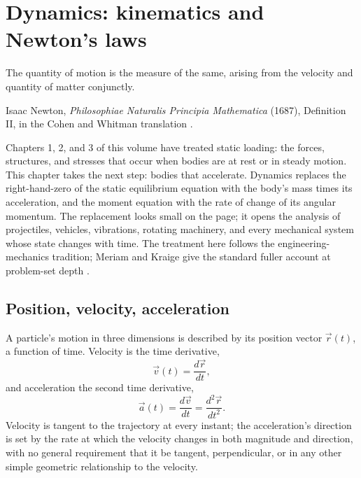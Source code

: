 \chapter{Dynamics: kinematics and Newton's laws}
\label{vol03:ch04}

\epigraph{The quantity of motion is the measure of the same, arising
from the velocity and quantity of matter conjunctly.}{Isaac Newton,
\emph{Philosophiae Naturalis Principia Mathematica} (1687), Definition
II, in the Cohen and Whitman translation \cite[p.~404]{hist:newton1687}.}


\noindent
Chapters 1, 2, and 3 of this volume have treated static loading: the
forces, structures, and stresses that occur when bodies are at rest
or in steady motion. This chapter takes the next step: bodies that
accelerate. Dynamics replaces the right-hand-zero of the static
equilibrium equation with the body's mass times its acceleration, and
the moment equation with the rate of change of its angular momentum.
The replacement looks small on the page; it opens the analysis of
projectiles, vehicles, vibrations, rotating machinery, and every
mechanical system whose state changes with time. The treatment here
follows the engineering-mechanics tradition; Meriam and Kraige give
the standard fuller account at problem-set depth
\cite{text:meriam-kraige2018}.

\section{Position, velocity, acceleration}

A particle's motion in three dimensions is described by its position
vector $\vec{r}(t)$, a function of time. Velocity is the time
derivative,
\[
\vec{v}(t) = \frac{d\vec{r}}{dt},
\]
and acceleration the second time derivative,
\[
\vec{a}(t) = \frac{d\vec{v}}{dt} = \frac{d^2 \vec{r}}{dt^2}.
\]
Velocity is tangent to the trajectory at every instant; the
acceleration's direction is set by the rate at which the velocity
changes in both magnitude and direction, with no general requirement
that it be tangent, perpendicular, or in any other simple geometric
relationship to the velocity.

